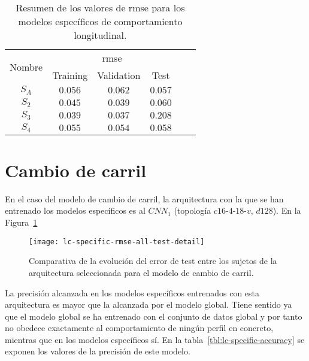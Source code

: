 \begin{table}
	\centering
	\caption[Resumen de los valores de \ac{rmse} para los modelos específicos de comportamiento longitudinal]{Resumen de los valores de \ac{rmse} para los modelos específicos de comportamiento longitudinal.}
	\label{tbl:lm-specific-rmse}
	\begin{tabular}{cccccc}
		\hline
		\multirow{2}{*}{Nombre} & \multicolumn{3}{c}{\ac{rmse}}      \\ 
		& Training & Validation & Test \\ \hline
		$S_A$ & $0.056$ & $0.062$ & $0.057$  \\
		$S_2$ & $0.045$ & $0.039$ & $0.060$  \\
		$S_3$ & $0.039$ & $0.037$ & $0.208$  \\
		$S_4$ & $0.055$ & $0.054$ & $0.058$  \\ \hline
	\end{tabular}
\end{table}

\section{Cambio de carril}

En el caso del modelo de cambio de carril, la arquitectura con la que se han entrenado los modelos específicos es al $CNN_1$ (topología $c16$-$4$-$18$-$v$, $d128$). En la Figura~\ref{fig:lc-specific-rmse-all-test-detail} 

\begin{figure}
	\centering
	\texttt{[image: lc-specific-rmse-all-test-detail]}
	\caption[Comparativa de la evolución del error de test entre los sujetos de la arquitectura seleccionada para el modelo de cambio de carril]{Comparativa de la evolución del error de test entre los sujetos de la arquitectura seleccionada para el modelo de cambio de carril.}
	\label{fig:lc-specific-rmse-all-test-detail}
\end{figure}

La precisión alcanzada en los modelos específicos entrenados con esta arquitectura es mayor que la alcanzada por el modelo global. Tiene sentido ya que el modelo global se ha entrenado con el conjunto de datos global y por tanto no obedece exactamente al comportamiento de ningún perfil en concreto, mientras que en los modelos específicos sí. En la tabla~\ref{tbl:lc-specific-accuracy} se exponen los valores de la precisión de este modelo.

